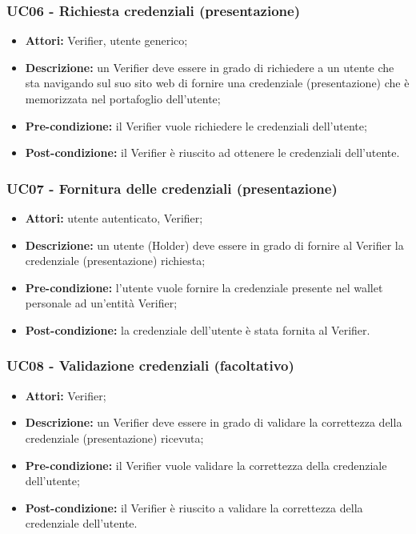 \subsubsection{UC06 - Richiesta credenziali (presentazione)}
\begin{itemize}
\item \textbf{Attori:} Verifier, utente generico;
\item \textbf{Descrizione:} un Verifier deve essere in grado di richiedere a un utente che sta navigando sul suo sito web di fornire una credenziale (presentazione) che è memorizzata nel portafoglio dell'utente;
\item \textbf{Pre-condizione:} il Verifier vuole richiedere le credenziali dell’utente;
\item \textbf{Post-condizione:} il Verifier è riuscito ad ottenere le credenziali dell’utente.
\end{itemize}

\subsubsection{UC07 - Fornitura delle credenziali (presentazione)}
\begin{itemize}
\item \textbf{Attori:} utente autenticato, Verifier;
\item \textbf{Descrizione:} un utente (Holder) deve essere in grado di fornire al Verifier la credenziale (presentazione) richiesta;
\item \textbf{Pre-condizione:} l’utente vuole fornire la credenziale presente nel wallet personale ad un'entità Verifier;
\item \textbf{Post-condizione:} la credenziale dell’utente è stata fornita al Verifier.
\end{itemize}

\subsubsection{UC08 - Validazione credenziali (facoltativo)}
\begin{itemize}
\item \textbf{Attori:} Verifier;
\item \textbf{Descrizione:} un Verifier deve essere in grado di validare la correttezza della credenziale (presentazione) ricevuta;
\item \textbf{Pre-condizione:} il Verifier vuole validare la correttezza della credenziale dell’utente;
\item \textbf{Post-condizione:} il Verifier è riuscito a validare la correttezza della credenziale dell’utente.
\end{itemize}
